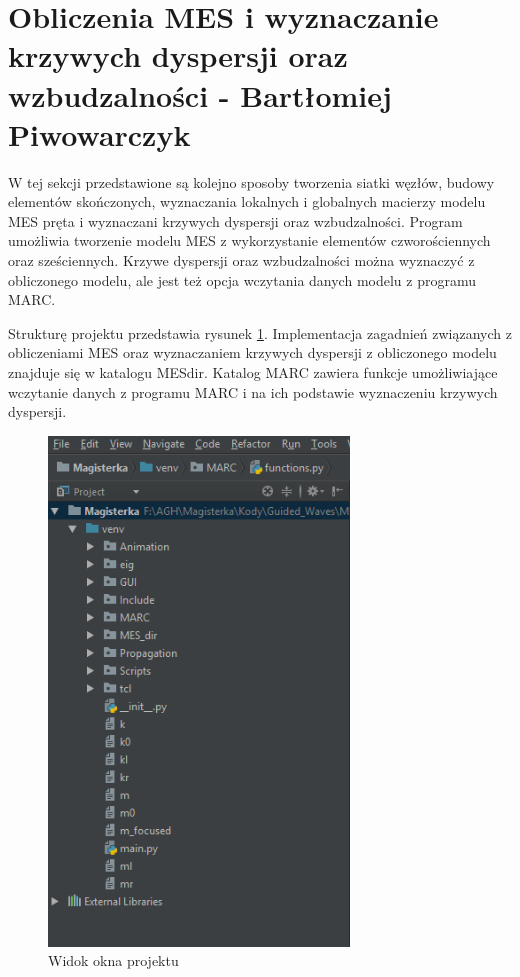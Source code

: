 \section{Obliczenia MES i wyznaczanie krzywych dyspersji oraz wzbudzalności - Bartłomiej Piwowarczyk}
\label{cha:obliczenia_mes}

W tej sekcji przedstawione są kolejno sposoby tworzenia siatki węzłów, budowy elementów skończonych, wyznaczania lokalnych i globalnych macierzy modelu MES pręta i wyznaczani krzywych dyspersji oraz wzbudzalności. Program umożliwia tworzenie modelu MES z wykorzystanie elementów czworościennych oraz sześciennych. Krzywe dyspersji oraz wzbudzalności można wyznaczyć z obliczonego modelu, ale jest też opcja wczytania danych modelu z programu MARC.

Strukturę projektu przedstawia rysunek \ref{fig:okno_projektu}. Implementacja zagadnień związanych z obliczeniami MES oraz wyznaczaniem krzywych dyspersji z obliczonego modelu znajduje się w katalogu MES\textunderscore dir. Katalog MARC zawiera funkcje umożliwiające wczytanie danych z programu MARC i na ich podstawie wyznaczeniu krzywych dyspersji.

\begin{figure}[h]
\centering
\includegraphics[width=8cm]{Zdjecia/5/okno_projektu}
\caption{Widok okna projektu}
\label{fig:okno_projektu}
\end{figure}











